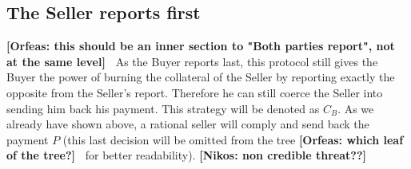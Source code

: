 \documentclass{cacthesis}
\newcommand{\authnote}[3]{{ \footnotesize \textbf{#1[#2: #3]~}}}
\newcommand{\orfnote}[1]{\authnote{\color{blue}}{Orfeas}{#1}}
\newcommand{\niknote}[1]{\authnote{\color{red}}{Nikos}{#1}}
\begin{document}
\subsection{The Seller reports first} \orfnote{this should be an inner
section to "Both parties report", not at the same level}
As the Buyer reports last, this protocol still gives the Buyer the power of
burning the collateral of the Seller by reporting exactly the opposite from the
Seller's report.\newline
Therefore he can still coerce the Seller into sending him back his payment. This
strategy will be denoted as $C_B$. As we already have shown above, a rational
seller will comply and send back the payment $P$ (this last decision will be
omitted from the tree \orfnote{which leaf of the tree?} for better readability).\niknote{non credible threat??}\newline
\end{document}
